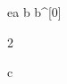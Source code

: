 \begin{eqcode}{e}{a }{}{}
  b \in {} \lend
  b^{[0]} \gets \begin{tmatrix} 2  \lend \end{tmatrix} \lend
  c \gets {} \lend 
   \lend %
\end{eqcode}

